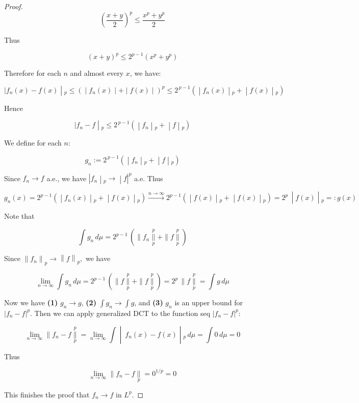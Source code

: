 \begin{proof}
\[(\frac{x + y}{2})^{p} \leq \frac{x^{p} + y^{p}}{2}\]

Thus

\[(x + y)^{p} \leq 2^{p - 1}(x^{p} + y^{p})\]

Therefore for each \(n\) and almost every \(x\), we have:

\[\left. |f_{n}(x) - f(x) \middle| {}_{p} \leq ( \middle| f_{n}(x) \middle| + \middle| f(x) \middle| )^{p} \leq 2^{\, p - 1}( \middle| f_{n}(x) \middle| {}_{p} + \middle| f(x) \middle| {}_{p}) \right.\]

Hence

\[\left. |f_{n} - f \middle| {}_{p} \leq 2^{\, p - 1}( \middle| f_{n} \middle| {}_{p} + \middle| f \middle| {}_{p}) \right.\]

We define for each \(n\):

\[\left. g_{n} := 2^{\, p - 1}( \middle| f_{n} \middle| {}_{p} + \middle| f \middle| {}_{p}) \right.\]

Since \(f_{n}\rightarrow f\) a.e., we have \(\left. |f_{n} \middle| {}_{p}\rightarrow \middle| f|^{p} \right.\) a.e. Thus

\[\left. g_{n}(x) = 2^{p - 1}( \middle| f_{n}(x) \middle| {}_{p} + \middle| f(x) \middle| {}_{p})\overset{n\rightarrow\infty}{\rightarrow}2^{p - 1}( \middle| f(x) \middle| {}_{p} + \middle| f(x) \middle| {}_{p}) = 2^{p}\, \middle| f(x) \middle| {}_{p} = :g(x) \right.\]

Note that

\[\int g_{n}\, d\mu = 2^{p - 1}\,( \parallel f_{n}\underset{p}{\overset{p}{\parallel}} + \parallel f\underset{p}{\overset{p}{\parallel}})\]

Since \(\left\| f_{n} \right\|_{p}\rightarrow\left\| f \right\|_{p},\) we have

\[\lim\limits_{n\rightarrow\infty}\int g_{n}\, d\mu = 2^{p - 1}\,( \parallel f\underset{p}{\overset{p}{\parallel}} + \parallel f\underset{p}{\overset{p}{\parallel}}) = 2^{p}\, \parallel f\underset{p}{\overset{p}{\parallel}} = \int g\, d\mu\]

Now we have \textbf{(1)} \(g_{n}\rightarrow g\), \textbf{(2)} \(\int g_{n}\rightarrow\int g\), and \textbf{(3)} \(g_{n}\) is an upper bound for \(|f_{n} - f|^{p}\). Then we can apply generalized DCT to the function seq \(|f_{n} - f|^{p}\):

\[\left. \lim\limits_{n\rightarrow\infty} \parallel f_{n} - f\underset{p}{\overset{p}{\parallel}} = \lim\limits_{n\rightarrow\infty}\int \middle| \ f_{n}(x) - f(x) \middle| {}_{p}\, d\mu = \int 0\, d\mu = 0 \right.\]

Thus

\[\lim\limits_{n\rightarrow\infty} \parallel f_{n} - f\underset{p}{\parallel} = 0^{1/p} = 0\]

This finishes the proof that \(f_{n}\rightarrow f\) in \(L^{p}\).

\end{proof}

